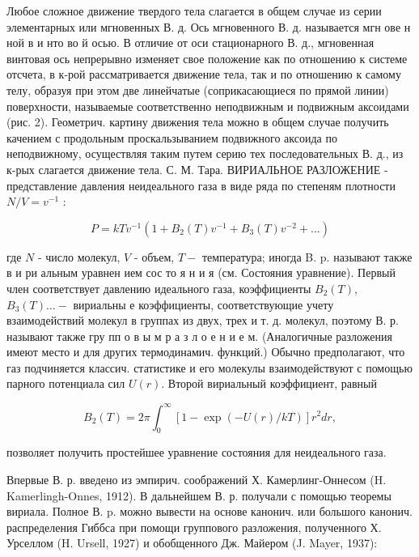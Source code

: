\documentclass[10pt]{article}
\begin{document}
Любое сложное движение твердого тела слагается в общем случае из серии элементарных или мгновенных В. д. Ось мгновенного В. д. называется мгн ове н ной в и нто во й осью. В отличие от оси стационарного В. д., мгновенная винтовая ось непрерывно изменяет свое положение как по отношению к системе отсчета, в к-рой рассматривается движение тела, так и по отношению к самому телу, образуя при этом две линейчатые (соприкасающиеся по прямой линии) поверхности, называемые соответственно неподвижным и подвижным аксоидами (рис. 2). Геометрич. картину движения тела можно в общем случае получить качением с продольным проскальзыванием подвижного аксоида по неподвижному, осуществляя таким путем серию тех последовательных В. д., из к-рых слагается движение тела. С. М. Тара. ВИРИАЛЬНОЕ РАЗЛОЖЕНИЕ - представление давления неидеального газа в виде ряда по степеням плотности $N / V=v^{-1}$ :



\[

P=k T v^{-1}\left(1+B_{2}(T) v^{-1}+B_{3}(T) v^{-2}+\ldots\right)

\]



где $N$ - число молекул, $V$ - объем, $T-$ температура; иногда B. p. называют также в и ри альным уравнен ием сос то я н и я (см. Состояния уравнение). Первый член соответствует давлению идеального газа, коэффициенты $B_{2}(T)$, $B_{3}(T) \ldots-$ вириальны е коэффициенты, соответствующие учету взаимодействий молекул в группах из двух, трех и т. д. молекул, поэтому В. р. называют также гру пп о в ы м р а з л о е н и е м. (Аналогичные разложения имеют место и для других термодинамич. функций.) Обычно предполагают, что газ подчиняется классич. статистике и его молекулы взаимодействуют с помощью парного потенциала сил $U(r)$. Второй вириальный коэффициент, равный



\[

B_{2}(T)=2 \pi \int_{0}^{\infty}[1-\exp (-U(r) / k T)] r^{2} d r,

\]



позволяет получить простейшее уравнение состояния для неидеального газа.



Впервые В. р. введено из эмпирич. соображений Х. Камерлинг-Оннесом (H. Kamerlingh-Onnes, 1912). В дальнейшем В. р. получали с помощью теоремы вириала. Полное В. p. можно вывести на основе канонич. или большого канонич. распределения Гиббса при помощи группового разложения, полученного Х. Урселлом (H. Ursell, 1927) и обобщенного Дж. Майером (J. Mayer, 1937):
\end{document}
